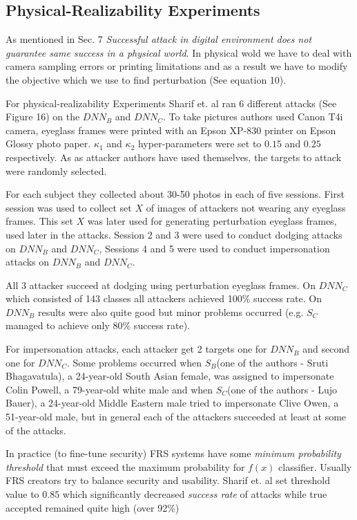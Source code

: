 \subsection{Physical-Realizability Experiments}

As mentioned in Sec. 7 \textit{Successful attack in digital environment does not guarantee same success in a physical world}. In physical wold we have to deal with camera sampling errors or printing limitations and as a result we have to modify the objective which we use to find perturbation (See equation 10). 

For physical-realizability Experiments Sharif et. al ran 6 different attacks (See Figure 16) on the $DNN_B$ and $DNN_C$. To take pictures authors used Canon T4i camera, eyeglass frames were printed with an Epson XP-830 printer on Epson Glossy photo paper. $\kappa_1$ and $\kappa_2$ hyper-parameters were set to $0.15$ and $0.25$ respectively. As as attacker authors have used themselves, the targets to attack were randomly selected. 

For each subject they collected about 30-50 photos in each of five sessions. First session was used to collect set $X$ of images of attackers not wearing any eyeglass frames. This set $X$ was later used for generating perturbation eyeglass frames, used later in the attacks. Session 2 and 3 were used to conduct dodging attacks on $DNN_B$ and $DNN_C$, Sessions 4 and 5 were used to conduct impersonation attacks  on $DNN_B$ and $DNN_C$.

All 3 attacker succeed at dodging using perturbation eyeglass frames. On $DNN_C$ which consisted of 143 classes all attackers achieved 100\% success rate. On $DNN_B$ results were also quite good but minor problems occurred (e.g. $S_C$ managed to achieve only 80\% success rate). 

For impersonation attacks, each attacker get 2 targets one for $DNN_B$ and second one for $DNN_C$. Some problems occurred when $S_B$(one of the authors  - Sruti Bhagavatula), a 24-year-old South Asian female, was assigned to impersonate Colin Powell, a 79-year-old white male and when $S_C$(one of the authors  - Lujo Bauer), a 24-year-old Middle Eastern male tried to impersonate Clive Owen, a 51-year-old male, but in general each of the attackers succeeded at least at some of the attacks. 

In practice (to fine-tune security) FRS systems have some \textit{minimum probability threshold} that must exceed the maximum probability for $f(x)$ classifier. Usually FRS creators try to balance security and usability. Sharif et. al set threshold value to $0.85$ which significantly decreased \textit{success rate} of attacks while true accepted remained quite high (over 92\%)


